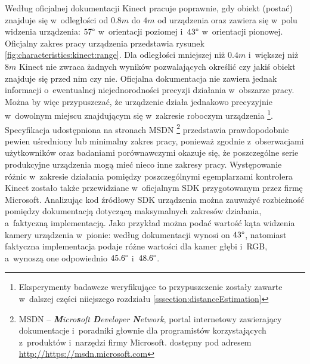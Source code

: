 Według oficjalnej dokumentacji  Kinect pracuje poprawnie, gdy obiekt (postać) znajduje się w~odległości od $0.8m$ do $4m$ od urządzenia oraz zawiera się w~polu widzenia urządzenia: $57\degree$ w~orientacji poziomej i~$43\degree$ w~orientacji pionowej. Oficjalny zakres pracy urządzenia przedstawia rysunek \ref{fig:characteristics:kinect:range}. Dla odległości mniejszej niż $0.4m$ i~większej niż $8m$ Kinect nie zwraca żadnych wyników pozwalających określić czy jakiś obiekt znajduje się przed nim czy nie. Oficjalna dokumentacja nie zawiera jednak informacji o~ewentualnej niejednorodności precyzji działania w~obszarze pracy. Można by więc przypuszczać, że urządzenie działa jednakowo precyzyjnie w~dowolnym miejscu znajdującym się w~zakresie roboczym urządzenia \footnote{Eksperymenty badawcze weryfikujące to przypuszczenie zostały zawarte w~dalszej części niiejszego rozdziału \ref{sssection:distanceEstimation}}. Specyfikacja udostępniona na stronach MSDN \footnote{MSDN -- \emph{\textbf{M}icro\textbf{s}oft \textbf{D}eveloper \textbf{N}etwork}, portal internetowy zawierający dokumentacje i~poradniki głownie dla programistów korzystających z~produktów i~narzędzi firmy Microsoft. dostępny pod adresem \url{http://https://msdn.microsoft.com}}
przedstawia prawdopodobnie pewien uśredniony lub minimalny zakres pracy, ponieważ zgodnie z~obserwacjami użytkowników  oraz badaniami porównawczymi \cite{DiFilippo2015} okazuje się, że poszczególne serie produkcyjne urządzenia mogą mieć nieco inne zakresy pracy. Występowanie różnic w~zakresie działania pomiędzy poszczególnymi egemplarzami kontrolera Kinect zostało także przewidziane w~oficjalnym SDK przygotowanym przez firmę Microsoft. Analizując kod źródłowy SDK urządzenia można zauważyć rozbieżność pomiędzy dokumentacją dotyczącą maksymalnych zakresów działania, a~faktyczną implementacją. Jako przykład można podać wartość kąta widzenia kamery urządzenia w~pionie: według dokumentacji wynosi on $43\degree$, natomiast faktyczna implementacja podaje różne wartości dla kamer głębi i~RGB, a~wynoszą one odpowiednio $45.6\degree$ i~$48.6\degree$. 
																															

																															
